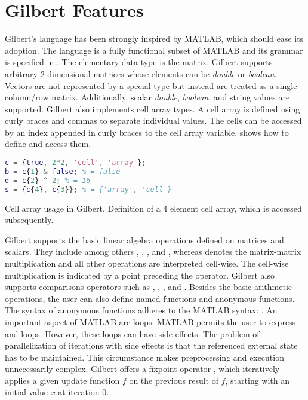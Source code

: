 \section{Gilbert Features}
\label{sec:gilbertFeatures}

Gilbert's language has been strongly inspired by MATLAB, which should ease its adoption.
The language is a fully functional subset of MATLAB and its grammar is specified in \cite{Rohrmann2014}.
The elementary data type is the matrix. Gilbert supports arbitrary $2$-dimensional matrices whose elements can be \emph{double} or \emph{boolean}.
Vectors are not represented by a special type but instead are treated as a single column/row matrix.
Additionally, scalar \emph{double}, \emph{boolean}, and string values are supported. Gilbert also implements cell array types.
A cell array is defined using curly braces and commas to separate individual values. The cells can be accessed by an index appended in curly braces to the cell array variable.  shows how to define and access them.

\begin{listing}[!h]
  \begin{CenteredBox}
    \begin{lstlisting}[language=Matlab,
        commentstyle=\color{black},
        stringstyle=\color{black},
    ]
c = {true, 2*2, 'cell', 'array'};
b = c{1} & false; % = false
d = c{2} ^ 2; % = 16
s = {c{4}, c{3}}; % = {'array', 'cell'} 
    \end{lstlisting}
  \end{CenteredBox}
  \caption{Cell array usage in Gilbert. Definition of a 4 element cell array, which is accessed subsequently.}
  \label{lst:cellArray}
\end{listing}

Gilbert supports the basic linear algebra operations defined on matrices and scalars. They include among others \code{+}, \code{-}, \code{/}, and \code{*}, whereas \code{*} denotes the matrix-matrix multiplication and all other operations are interpreted cell-wise. The cell-wise multiplication is indicated by a point preceding the operator. Gilbert also supports comparisons operators such as \code{>}, \code{>=}, \code{==}, and \code{\textasciitilde=}. Besides the basic arithmetic operations, the user can also define named functions and anonymous functions. The syntax of anonymous functions adheres to the MATLAB syntax: . An important aspect of MATLAB are loops. MATLAB permits the user to express  and  loops. However, these loops can have side effects. The problem of parallelization of iterations with side effects is that the referenced external state has to be maintained. This circumstance makes preprocessing and execution unnecessarily complex. Gilbert offers a fixpoint operator , which iteratively applies a given update function $f$ on the previous result of $f$, starting with an initial value $x$ at iteration $0$.

